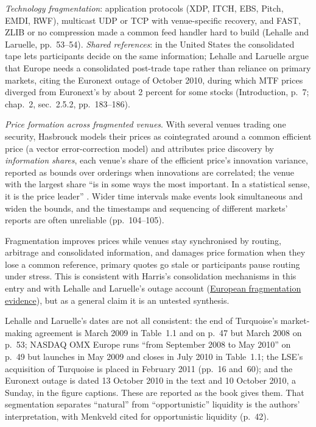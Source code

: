 \begin{qfmechanism}
\emph{Technology fragmentation}: application protocols (XDP, ITCH, EBS, Pitch, EMDI, RWF), multicast UDP or TCP with venue-specific recovery, and FAST, ZLIB or no compression made a common feed handler hard to build (Lehalle and Laruelle, pp.~53--54). \emph{Shared references}: in the United States the consolidated tape lets participants decide on the same information; Lehalle and Laruelle argue that Europe needs a consolidated post-trade tape rather than reliance on primary markets, citing the Euronext outage of October 2010, during which MTF prices diverged from Euronext's by about 2 percent for some stocks (Introduction, p.~7; chap.~2, sec.~2.5.2, pp.~183--186).

\emph{Price formation across fragmented venues}. With several venues trading one security, Hasbrouck models their prices as cointegrated around a common efficient price (a vector error-correction model) and attributes price discovery by \emph{information shares}, each venue's share of the efficient price's innovation variance, reported as bounds over orderings when innovations are correlated; the venue with the largest share ``is in some ways the most important. In a statistical sense, it is the price leader'' \citep[chap.~10, secs.~10.2--10.3, pp.~99--102]{s6-hasbrouck}. Wider time intervals make events look simultaneous and widen the bounds, and the timestamps and sequencing of different markets' reports are often unreliable (pp.~104--105).

Fragmentation improves prices while venues stay synchronised by routing, arbitrage and consolidated information, and damages price formation when they lose a common reference, primary quotes go stale or participants pause routing under stress. This is consistent with Harris's consolidation mechanisms in this entry and with Lehalle and Laruelle's outage account (\hyperref[ev:european-fragmentation-evidence]{European fragmentation evidence}), but as a general claim it is an untested synthesis.

 Lehalle and Laruelle's dates are not all consistent: the end of Turquoise's market-making agreement is March 2009 in Table~1.1 and on p.~47 but March 2008 on p.~53; NASDAQ OMX Europe runs ``from September 2008 to May 2010'' on p.~49 but launches in May 2009 and closes in July 2010 in Table~1.1; the LSE's acquisition of Turquoise is placed in February 2011 (pp.~16 and~60); and the Euronext outage is dated 13 October 2010 in the text and 10 October 2010, a Sunday, in the figure captions. These are reported as the book gives them. That segmentation separates ``natural'' from ``opportunistic'' liquidity is the authors' interpretation, with Menkveld cited for opportunistic liquidity (p.~42).


\end{qfmechanism}
